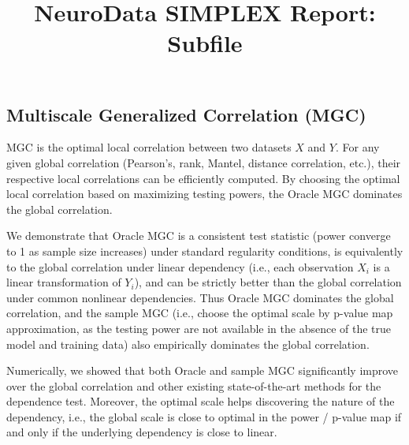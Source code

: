 \documentclass[simplex.tex]{subfiles}
\title{NeuroData SIMPLEX Report: Subfile}
\begin{document}

\subsection{Multiscale Generalized Correlation (MGC)}

MGC is the optimal local correlation between two datasets  $X$ and $Y$.
For any given global correlation (Pearson’s, rank, Mantel, distance
correlation, etc.), their respective local correlations can be
efficiently computed.  By choosing the optimal local correlation based
on maximizing testing powers, the Oracle MGC dominates the global
correlation.

We demonstrate that Oracle MGC is a consistent test statistic (power
converge to 1 as sample size increases) under standard regularity
conditions, is equivalently to the global correlation under linear
dependency (i.e., each observation $X_i$ is a linear transformation of
$Y_i$), and can be strictly better than the global correlation under
common nonlinear dependencies. Thus Oracle MGC dominates the global
correlation, and the sample MGC (i.e., choose the optimal scale by
p-value map approximation, as the testing power are not available in the
absence of the true model and training data) also empirically dominates
the global correlation.

Numerically, we showed that both Oracle and sample MGC significantly
improve over the global correlation and other existing state-of-the-art
methods for the dependence test. Moreover, the optimal scale helps
discovering the nature of the dependency, i.e., the global scale is
close to optimal in the power / p-value map if and only if the
underlying dependency is close to linear.
\end{document}
